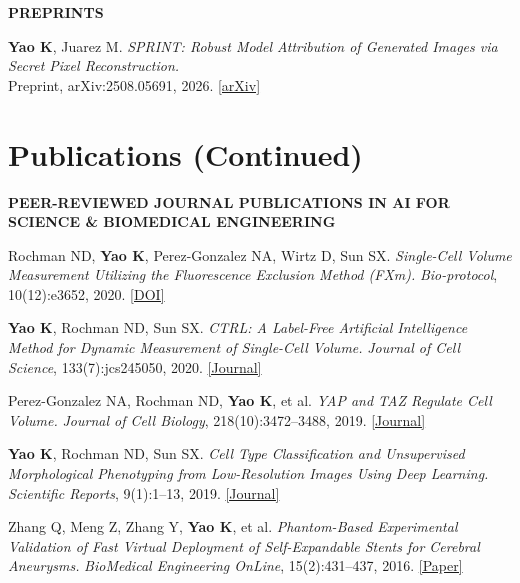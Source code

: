 \documentclass[10pt,a4paper]{article}
\newcommand{\subhead}[1]{%
  \Needspace{3\baselineskip}%
  \vspace{3.8pt}%
  {\headingfont\fontsize{8.45}{10.0}\selectfont\bfseries\color{accent}\addfontfeature{LetterSpace=2.5}\MakeUppercase{#1}}\par
  \vspace{1.8pt}%
}
\newcommand{\publink}[2]{\href{#1}{\fontsize{8.0}{9.4}\selectfont\color{accent}[#2]}}
\newcommand{\cofirst}{\raisebox{0.35ex}{\fontsize{6.6}{7}\selectfont *}}
\begin{document}
\subhead{Preprints}
\begin{enumerate}[label={\fontsize{8.15}{9.6}\selectfont\color{muted}\headingfont[P\arabic*]}, leftmargin=2.3em, labelsep=0.55em, topsep=2.6pt, itemsep=2.5pt, parsep=0pt]
  \item \textbf{Yao K}, Juarez M. \textit{SPRINT: Robust Model Attribution of Generated Images via Secret Pixel Reconstruction.} \\ Preprint, arXiv:2508.05691, 2026. \publink{https://arxiv.org/abs/2508.05691}{arXiv}
\end{enumerate}

\newpage
\linespread{1.035}\selectfont
\titlespacing*{\section}{0pt}{6.2pt}{2.8pt}

\section*{Publications (Continued)}
\subhead{Peer-Reviewed Journal Publications in AI for Science \& Biomedical Engineering}
\begin{enumerate}[label={\fontsize{8.1}{9.5}\selectfont\color{muted}\headingfont[J\arabic*]}, leftmargin=2.3em, labelsep=0.55em, topsep=1.2pt, itemsep=1.6pt, parsep=0pt]
  \item Rochman ND\cofirst, \textbf{Yao K}\cofirst, Perez-Gonzalez NA\cofirst, Wirtz D, Sun SX. \textit{Single-Cell Volume Measurement Utilizing the Fluorescence Exclusion Method (FXm).} \textit{Bio-protocol}, 10(12):e3652, 2020. \publink{https://bio-protocol.org/en/bpdetail?id=3652&type=0}{DOI}
  \item \textbf{Yao K}\cofirst, Rochman ND\cofirst, Sun SX. \textit{CTRL: A Label-Free Artificial Intelligence Method for Dynamic Measurement of Single-Cell Volume.} \textit{Journal of Cell Science}, 133(7):jcs245050, 2020. \publink{https://journals.biologists.com/jcs/article/133/7/jcs245050/224905/CTRL-a-label-free-artificial-intelligence-method}{Journal}
  \item Perez-Gonzalez NA\cofirst, Rochman ND\cofirst, \textbf{Yao K}\cofirst, et al. \textit{YAP and TAZ Regulate Cell Volume.} \textit{Journal of Cell Biology}, 218(10):3472--3488, 2019. \publink{https://rupress.org/jcb/article/218/10/3472/120715/YAP-and-TAZ-regulate-cell-volumeYAP-and-TAZ}{Journal}
  \item \textbf{Yao K}\cofirst, Rochman ND\cofirst, Sun SX. \textit{Cell Type Classification and Unsupervised Morphological Phenotyping from Low-Resolution Images Using Deep Learning.} \textit{Scientific Reports}, 9(1):1--13, 2019. \publink{https://www.nature.com/articles/s41598-019-50010-9}{Journal}
  \item Zhang Q, Meng Z, Zhang Y, \textbf{Yao K}, et al. \textit{Phantom-Based Experimental Validation of Fast Virtual Deployment of Self-Expandable Stents for Cerebral Aneurysms.} \textit{BioMedical Engineering OnLine}, 15(2):431--437, 2016. \publink{https://europepmc.org/article/pmc/5260011}{Paper}
\end{enumerate}
\end{document}
